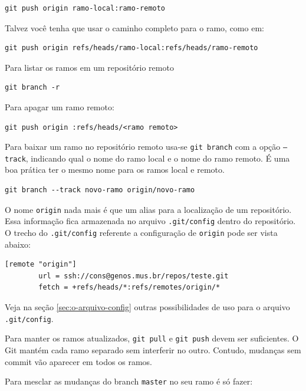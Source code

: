\documentclass[12pt,brazil]{book}
\begin{document}
\begin{verbatim}
git push origin ramo-local:ramo-remoto
\end{verbatim}

Talvez você tenha que usar o caminho completo para o ramo, como em:

\begin{verbatim}
git push origin refs/heads/ramo-local:refs/heads/ramo-remoto
\end{verbatim}

Para listar os ramos em um repositório remoto

\begin{verbatim}
git branch -r
\end{verbatim}

Para apagar um ramo remoto:

\begin{verbatim}
git push origin :refs/heads/<ramo remoto>
\end{verbatim}

Para baixar um ramo no repositório remoto usa-se \texttt{git branch}
com a opção \texttt{--track}, indicando qual o nome do ramo local e o
nome do ramo remoto. É uma boa prática ter o mesmo nome para os ramos
local e remoto.

\begin{verbatim}
git branch --track novo-ramo origin/novo-ramo
\end{verbatim}

O nome \texttt{origin} nada mais é que um alias para a localização de
um repositório. Essa informação fica armazenada no arquivo
\texttt{.git/config} dentro do repositório. O trecho do
\texttt{.git/config} referente a configuração de \texttt{origin} pode
ser vista abaixo:

\begin{verbatim}
[remote "origin"]
        url = ssh://cons@genos.mus.br/repos/teste.git
        fetch = +refs/heads/*:refs/remotes/origin/*
\end{verbatim}

Veja na seção \ref{sec:o-arquivo-config} outras possibilidades de uso
para o arquivo \texttt{.git/config}.

Para manter os ramos atualizados, \texttt{git pull} e \texttt{git
  push} devem ser suficientes. O Git mantém cada ramo separado sem
interferir no outro. Contudo, mudanças sem commit vão aparecer em
todos os ramos.

Para mesclar as mudanças do branch \texttt{master} no seu ramo é só
fazer:
\end{document}
